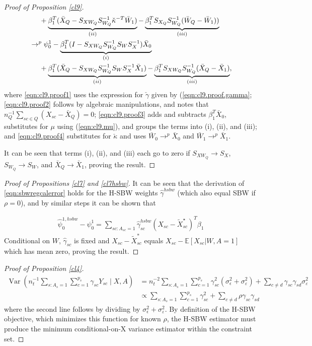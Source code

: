 \begin{proof}[Proof of Proposition \ref{cl9}]
\begin{align}
    \nonumber & \hskip.5cm {} + \underbrace{\beta_1^T (\bar{X}_Q - S_{XW_Q} S_{W_Q}^{-1} \check{\kappa}^{-T}\bar{W}_1)}_{(ii)} - \underbrace{\beta_1^TS_{X_Q}S_{W_Q}^{-1}(\bar{W}_Q - \bar{W}_1))}_{(iii)}\\
\label{eqn:cl9.proof4}    & \to^p \psi_0^1 - \underbrace{\beta_1^T(I - S_{XW_Q}S_{W_Q}^{-1}S_WS_X^{-1})\bar{X}_0}_{(i)} \\
    \nonumber & \hskip.5cm {} + \underbrace{\beta_1^T(\bar{X}_Q - S_{XW_Q}S_{W_Q}^{-1} S_W S_X^{-1} \bar{X}_1)}_{(ii)} - \underbrace{\beta_1^TS_{XW_Q}S_{W_Q}^{-1}(\bar{X}_Q - \bar{X}_1)}_{(iii)}, 
\end{align}
where \eqref{eqn:cl9.proof1} uses the expression for $\check{\gamma}$ given by (\ref{eqn:cl9.proof.gamma}; \eqref{eqn:cl9.proof2} follows by algebraic manipulations, and notes that $n_Q^{-1}\sum_{sc \in Q} (X_{sc} - \bar{X}_Q) = 0$; \eqref{eqn:cl9.proof3} adds and subtracts $\beta_1^T \bar{X}_0$,  substitutes for $\mu$ using (\ref{eqn:cl9.mu}), and groups the terms into (i), (ii), and (iii); and \eqref{eqn:cl9.proof4} substitutes for $\check{\kappa}$ and uses $\bar{W}_0 \to^p \bar{X}_0$ and $\bar{W}_1 \to^p \bar{X}_1$.

It can be seen that terms (i), (ii), and (iii) each go to zero if $S_{XW_Q} \to S_X$, $S_{W_Q} \to S_W$, and $\bar{X}_Q \to \bar{X}_1$, proving the result. 
\end{proof}

\begin{proof}[Proof of Propositions \ref{cl7} and \ref{cl7hsbw}]
   It can be seen that the derivation of \eqref{eqn:sbwregcalerror} holds for the H-SBW weights $\hat{\gamma}^{hsbw}$ (which also equal SBW if $\rho=0$), and by similar steps it can be shown that 
    
    \begin{align*}
        \hat{\psi}^{1, hsbw}_0 - \psi^1_0 = \sum_{sc: A_{sc} = 1}\hat{\gamma}^{hsbw}_{sc}(X_{sc} - \tilde{X}_{sc}^\star)^T\beta_1
    \end{align*}
Conditional on $W$, $\hat{\gamma}_{sc}$ is fixed and $X_{sc} - \tilde{X}_{sc}^*$ equals $X_{sc} - \mathbb{E}[X_{sc}|W, A=1]$ which has mean zero, proving the result.
\end{proof}


\begin{proof}[Proof of Proposition \ref{cl4}]
\begin{align*}
    \operatorname{Var}\left( n_t^{-1}\sum_{s: A_s = 1}\sum_{c = 1}^{p_s}\gamma_{sc}Y_{sc} \mid X, A\right) &= n_t^{-2}\sum_{s: A_s = 1}\sum_{c = 1}^{p_s}\gamma_{sc}^2(\sigma^2_{\epsilon} + \sigma^2_{\varepsilon}) + \sum_{c \ne d}\gamma_{sc}\gamma_{sd}\sigma^2_{\varepsilon} \\
    &\propto \sum_{s: A_s = 1}\sum_{c = 1}^{p_s}\gamma_{sc}^2 + \sum_{c \ne d}\rho \gamma_{sc}\gamma_{sd}
\end{align*}
%
where the second line follows by dividing by $\sigma^2_{\epsilon} + \sigma^2_{\varepsilon}$. By definition of the H-SBW objective, which minimizes this function for known $\rho$, the H-SBW estimator must produce the minimum conditional-on-X variance estimator within the constraint set.
\end{proof}


